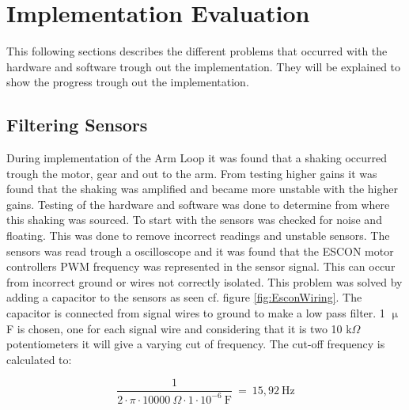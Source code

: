 \startexplain
{}
\stopexplain


\newpage


\section{Implementation Evaluation}
This following sections describes the different problems that occurred with the hardware and software trough out the implementation. They will be explained to show the progress trough out the implementation.
\\
\subsection{Filtering Sensors}
During implementation of the Arm Loop it was found that a shaking occurred trough the motor, gear and out to the arm. From testing higher gains it was found that the shaking was amplified and became more unstable with the higher gains. Testing of the hardware and software was done to determine from where this shaking was sourced. To start with the sensors was checked for noise and floating. This was done to remove incorrect readings and unstable sensors. The sensors was read trough a oscilloscope and it was found that the ESCON motor controllers PWM frequency was represented in the sensor signal. This can occur from incorrect ground or wires not correctly isolated. This problem was solved by adding a capacitor to the sensors as seen cf. figure \ref{fig:EsconWiring}. The capacitor is connected from signal wires to ground to make a low pass filter. 1 $\upmu$F is chosen, one for each signal wire and considering that it is two 10 k$\Omega$ potentiometers it will give a varying cut of frequency. The cut-off frequency is calculated to:       

\begin{equation}
\frac{1}{2\cdot \pi \cdot 10000\ \Omega \cdot 1 \cdot 10^{-6}\  \text{F}}\ =\ 15,92\ \text{Hz}
\end{equation}

